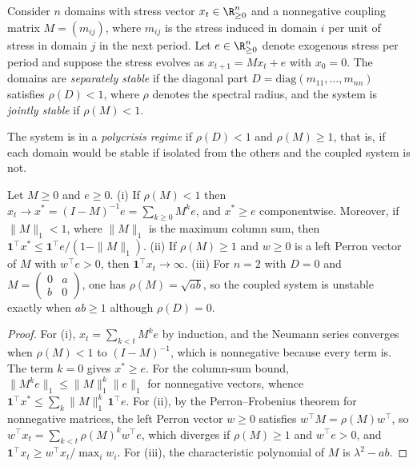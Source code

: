 Consider $n$ domains with stress vector $x_t\in\R_{\ge0}^n$ and a nonnegative coupling matrix $M=(m_{ij})$, where $m_{ij}$ is the stress induced in domain $i$ per unit of stress in domain $j$ in the next period. Let $e\in\R^n_{\ge0}$ denote exogenous stress per period and suppose the stress evolves as $x_{t+1}=Mx_t+e$ with $x_0=0$. The domains are \emph{separately stable} if the diagonal part $D=\mathrm{diag}(m_{11},\dots,m_{nn})$ satisfies $\rho(D)<1$, where $\rho$ denotes the spectral radius, and the system is \emph{jointly stable} if $\rho(M)<1$.

\begin{definition}[Polycrisis]
The system is in a \emph{polycrisis regime} if $\rho(D)<1$ and $\rho(M)\ge 1$, that is, if each domain would be stable if isolated from the others and the coupled system is not.
\end{definition}

\begin{proposition}
Let $M\ge0$ and $e\ge0$. (i) If $\rho(M)<1$ then $x_t\to x^\ast=(I-M)^{-1}e=\sum_{k\ge0}M^ke$, and $x^\ast\ge e$ componentwise. Moreover, if $\|M\|_1<1$, where $\|M\|_1$ is the maximum column sum, then $\mathbf 1^\top x^\ast\le \mathbf 1^\top e/(1-\|M\|_1)$. (ii) If $\rho(M)\ge1$ and $w\ge0$ is a left Perron vector of $M$ with $w^\top e>0$, then $\mathbf 1^\top x_t\to\infty$. (iii) For $n=2$ with $D=0$ and $M=\left(\begin{smallmatrix}0&a\\b&0\end{smallmatrix}\right)$, one has $\rho(M)=\sqrt{ab}$, so the coupled system is unstable exactly when $ab\ge1$ although $\rho(D)=0$.
\end{proposition}

\begin{proof}
For (i), $x_t=\sum_{k<t}M^ke$ by induction, and the Neumann series converges when $\rho(M)<1$ to $(I-M)^{-1}$, which is nonnegative because every term is. The term $k=0$ gives $x^\ast\ge e$. For the column-sum bound, $\|M^ke\|_1\le\|M\|_1^k\|e\|_1$ for nonnegative vectors, whence $\mathbf 1^\top x^\ast\le\sum_k\|M\|_1^k\,\mathbf 1^\top e$. For (ii), by the Perron--Frobenius theorem for nonnegative matrices, the left Perron vector $w\ge0$ satisfies $w^\top M=\rho(M)w^\top$, so $w^\top x_t=\sum_{k<t}\rho(M)^kw^\top e$, which diverges if $\rho(M)\ge1$ and $w^\top e>0$, and $\mathbf 1^\top x_t\ge w^\top x_t/\max_iw_i$. For (iii), the characteristic polynomial of $M$ is $\lambda^2-ab$.
\end{proof}

